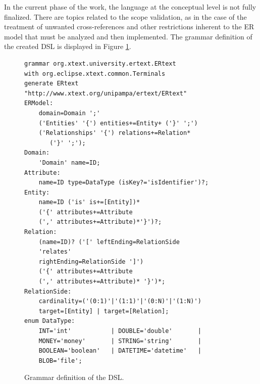 \documentclass[a4paper,twoside,anonymous]{article}
\begin{document}


In the current phase of the work, the language at the conceptual level is not fully finalized.
There are topics related to the scope validation, as in the case of the treatment of unwanted cross-references and other restrictions inherent to the ER model that must be analyzed and then implemented.
The grammar definition of the created DSL is displayed in Figure \ref{fig:DSLvsFinal}.



\begin{figure}[!htb]
    \centering
    \begin{scriptsize}
    \begin{lstlisting}[basicstyle = \tiny, language = Xtext, frame = trbl]
grammar org.xtext.university.ertext.ERtext 
with org.eclipse.xtext.common.Terminals
generate ERtext "http://www.xtext.org/unipampa/ertext/ERtext"
ERModel:
    domain=Domain ';'
    ('Entities' '{') entities+=Entity+ ('}' ';')
    ('Relationships' '{') relations+=Relation*
       ('}' ';');
Domain:
    'Domain' name=ID;
Attribute:
    name=ID type=DataType (isKey?='isIdentifier')?;
Entity:
    name=ID ('is' is+=[Entity])*
    ('{' attributes+=Attribute
    (',' attributes+=Attribute)*'}')?;
Relation:
    (name=ID)? ('[' leftEnding=RelationSide 
    'relates' 
    rightEnding=RelationSide ']') 
    ('{' attributes+=Attribute 
    (',' attributes+=Attribute)* '}')*;
RelationSide:
    cardinality=('(0:1)'|'(1:1)'|'(0:N)'|'(1:N)') 
    target=[Entity] | target=[Relation];
enum DataType:
    INT='int'           | DOUBLE='double'       | 
    MONEY='money'       | STRING='string'       |
    BOOLEAN='boolean'   | DATETIME='datetime'   |
    BLOB='file';
    \end{lstlisting}
    \end{scriptsize}
    \caption{Grammar definition of the DSL.}
    \label{fig:DSLvsFinal}
\end{figure}
\end{document}
